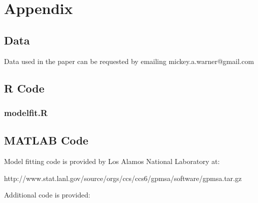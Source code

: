 \documentclass[11pt]{article}
\begin{document}













\section*{Appendix}

\subsection*{Data}

Data used in the paper can be requested by emailing mickey.a.warner@gmail.com

\subsection*{R Code}
\begin{tiny}
\subsubsection*{modelfit.R}

\end{tiny}

\subsection*{MATLAB Code}
Model fitting code is provided by Los Alamos National Laboratory at:

http://www.stat.lanl.gov/source/orgs/ccs/ccs6/gpmsa/software/gpmsa.tar.gz

Additional code is provided:
\end{document}
